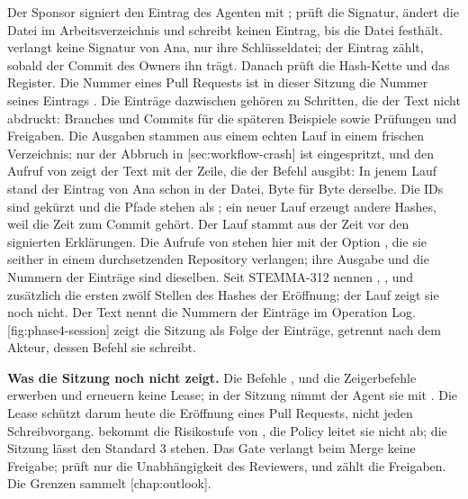 Der Sponsor signiert den Eintrag des Agenten mit ;
 prüft die Signatur, ändert die Datei im Arbeitsverzeichnis und schreibt keinen
Eintrag, bis  die Datei festhält.
 verlangt keine Signatur von Ana, nur ihre Schlüsseldatei;
der Eintrag zählt, sobald der Commit des Owners ihn trägt.
Danach prüft  die Hash-Kette und das Register.
Die Nummer eines Pull Requests ist in dieser Sitzung die Nummer seines Eintrags .
Die Einträge dazwischen gehören zu Schritten, die der Text nicht abdruckt:
Branches und Commits für die späteren Beispiele sowie Prüfungen und Freigaben.
Die Ausgaben stammen aus einem echten Lauf in einem frischen Verzeichnis;
nur der Abbruch in [sec:workflow-crash] ist eingespritzt,
und den Aufruf von  zeigt der Text mit der Zeile, die der Befehl ausgibt:
In jenem Lauf stand der Eintrag von Ana schon in der Datei, Byte für Byte derselbe.
Die IDs sind gekürzt und die Pfade stehen als ;
ein neuer Lauf erzeugt andere Hashes, weil die Zeit zum Commit gehört.
Der Lauf stammt aus der Zeit vor den signierten Erklärungen.
Die Aufrufe von  stehen hier mit der Option , die sie seither in einem
durchsetzenden Repository verlangen; ihre Ausgabe und die Nummern der Einträge sind dieselben.
Seit STEMMA-312 nennen , ,  und 
zusätzlich die
ersten zwölf Stellen des Hashes der Eröffnung; der Lauf zeigt sie noch nicht.
Der Text nennt die Nummern der Einträge im Operation Log.
[fig:phase4-session] zeigt die Sitzung als Folge der Einträge, getrennt nach dem
Akteur, dessen Befehl sie schreibt.

\startplacefigure[title={Die Sitzung der Phase 4: Einträge im Operation Log
    von Daniel, vom Agenten und von Ana},
    reference=fig:phase4-session,location=here]
\stopplacefigure

\startinfobox
{\bf Was die Sitzung noch nicht zeigt.}
Die Befehle ,  und die Zeigerbefehle erwerben und erneuern keine Lease;
in der Sitzung nimmt der Agent sie mit .
Die Lease schützt darum heute die Eröffnung eines Pull Requests, nicht jeden Schreibvorgang.
 bekommt die Risikostufe von , die Policy leitet sie nicht ab;
die Sitzung lässt den Standard 3 stehen.
Das Gate verlangt beim Merge keine Freigabe;  prüft nur die Unabhängigkeit
des Reviewers, und  zählt die Freigaben.
Die Grenzen sammelt [chap:outlook].
\stopinfobox

